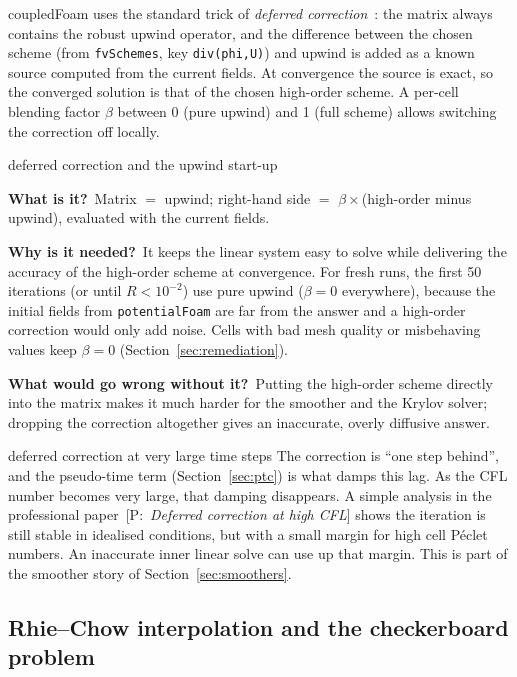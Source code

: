 \documentclass[11pt,a4paper]{article}
\newcommand{\code}[1]{\texttt{#1}}
\newcommand{\bbwhat}{\par\smallskip\noindent\textbf{What is it?}\ }
\newcommand{\bbwhy}{\par\smallskip\noindent\textbf{Why is it needed?}\ }
\newcommand{\bbwithout}{\par\smallskip\noindent\textbf{What would go wrong
  without it?}\ }
\newcommand{\pro}[1]{\ {\small[P:~\textit{#1}]}}
\begin{document}
coupledFoam uses the standard trick of \emph{deferred
correction}~\cite{Khosla1974,Ferziger2002}: the matrix always contains the
robust upwind operator, and the difference between the chosen scheme (from
\code{fvSchemes}, key \code{div(phi,U)}) and upwind is added as a known
source computed from the current fields. At convergence the source is exact,
so the converged solution is that of the chosen high-order scheme. A per-cell
blending factor $\beta$ between 0 (pure upwind) and 1 (full scheme) allows
switching the correction off locally.

\begin{bblock}{deferred correction and the upwind start-up}
\bbwhat Matrix $=$ upwind; right-hand side $=$ $\beta\times$(high-order
minus upwind), evaluated with the current fields.
\bbwhy It keeps the linear system easy to solve while delivering the
accuracy of the high-order scheme at convergence. For fresh runs, the first
50 iterations (or until $R<10^{-2}$) use pure upwind ($\beta=0$
everywhere), because the initial fields from \code{potentialFoam} are far
from the answer and a high-order correction would only add noise. Cells
with bad mesh quality or misbehaving values keep $\beta=0$
(Section~\ref{sec:remediation}).
\bbwithout Putting the high-order scheme directly into the matrix makes it
much harder for the smoother and the Krylov solver; dropping the correction
altogether gives an inaccurate, overly diffusive answer.
\end{bblock}

\begin{pitfall}{deferred correction at very large time steps}
  The correction is ``one step behind'', and the pseudo-time term
  (Section~\ref{sec:ptc}) is what damps this lag. As the CFL number becomes
  very large, that damping disappears. A simple analysis in the
  professional paper\pro{Deferred correction at high CFL} shows the iteration is still stable in
  idealised conditions, but with a small margin for high cell P\'eclet
  numbers. An inaccurate inner linear solve can use up that margin. This is
  part of the smoother story of Section~\ref{sec:smoothers}.
\end{pitfall}

\subsection{Rhie--Chow interpolation and the checkerboard problem}\label{sec:rc}
\end{document}
